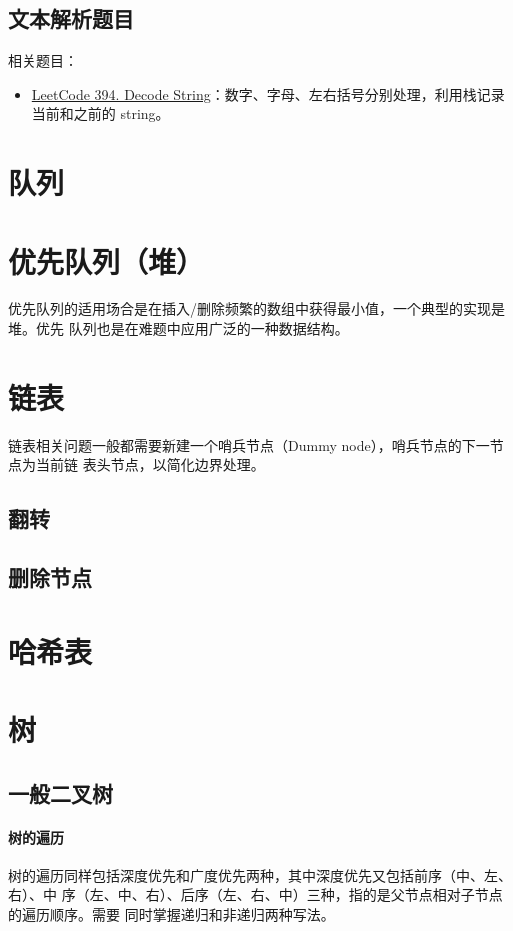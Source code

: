 \subsection{文本解析题目}

相关题目：

\begin{itemize}
  \item
    \href{https://leetcode.com/problems/decode-string/}{LeetCode 394. Decode
      String}：数字、字母、左右括号分别处理，利用栈记录当前和之前的 string。
\end{itemize}

\section{队列}

\section{优先队列（堆）}
优先队列的适用场合是在插入/删除频繁的数组中获得最小值，一个典型的实现是堆。优先
队列也是在难题中应用广泛的一种数据结构。

\section{链表}
链表相关问题一般都需要新建一个哨兵节点（Dummy node），哨兵节点的下一节点为当前链
表头节点，以简化边界处理。

\subsection{翻转}

\subsection{删除节点}

\section{哈希表}

\section{树}

\subsection{一般二叉树}
\paragraph{树的遍历}
树的遍历同样包括深度优先和广度优先两种，其中深度优先又包括前序（中、左、右）、中
序（左、中、右）、后序（左、右、中）三种，指的是父节点相对子节点的遍历顺序。需要
同时掌握递归和非递归两种写法。

